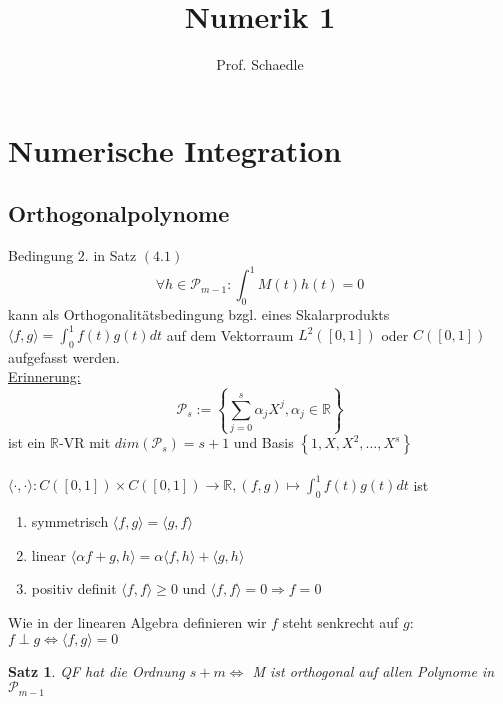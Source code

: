 \documentclass[12pt]{article}
\author{Prof. Schaedle}
\title{Numerik 1}
\theoremstyle{break}
\newtheorem{theorem}{Satz}[subsection]
\begin{document}
\maketitle

\newpage

\section{Numerische Integration}



\subsection{Orthogonalpolynome}
Bedingung $2.$ in Satz $(4.1)$ 
$$ \forall h \in \mathcal{P}_{m-1}: \int_0^1 M(t)h(t) = 0$$
kann als Orthogonalitätsbedingung bzgl. eines Skalarprodukts $\langle f, g\rangle = \int_0^1 f(t)g(t)dt$ auf dem Vektorraum $L^2([0,1])$ oder $C([0,1])$ aufgefasst werden. \\
\underline{Erinnerung:}
$$\mathcal{P}_s := \left\{ \sum_{j=0}^s \alpha_j X^j, \alpha_j \in \mathbb{R} \right\}$$ 
ist ein $\mathbb{R}$-VR mit $dim(\mathcal{P}_s) = s+1$ und Basis $\left\{ 1, X, X^2, ..., X^s \right\}$\\ \\
$\langle\cdot,\cdot\rangle : C([0,1]) \times C([0,1]) \rightarrow \mathbb{R}, (f, g) \mapsto \int_0^1 f(t)g(t)dt$ ist 
\begin{enumerate}
  \item symmetrisch $ \langle f, g\rangle = \langle g, f\rangle$
  \item linear $\langle \alpha f + g, h\rangle = \alpha \langle f, h\rangle + \langle g, h\rangle$
  \item positiv definit $\langle f, f\rangle \geq 0 $ und $ \langle f, f\rangle = 0 \Rightarrow f = 0$
\end{enumerate}
Wie in der linearen Algebra definieren wir $f$ steht senkrecht auf $g$: $f \perp g \Leftrightarrow \langle f, g\rangle = 0$

\begin{theorem}
QF hat die Ordnung $s+m \Leftrightarrow $ M ist orthogonal auf allen Polynome in $\mathcal{P}_{m-1}$
\end{theorem}
\end{document}

